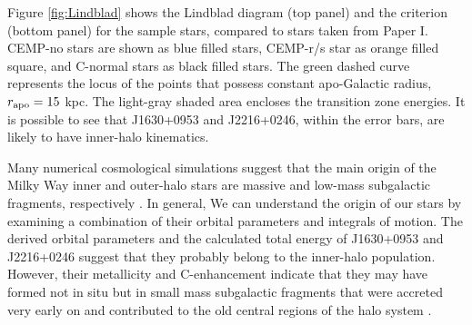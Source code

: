 Figure \ref{fig:Lindblad} shows the Lindblad diagram (top panel) and the
\citet{2014ApJ...788..180C} criterion (bottom panel) for the sample stars,
compared to stars taken from Paper I. CEMP-no stars are shown as blue filled
stars, CEMP-r/s star as orange filled square, and C-normal stars as black filled
stars. The green dashed curve represents the locus of the points that possess
constant apo-Galactic radius, $r_\mathrm{apo} = 15$ kpc. The light-gray shaded area
encloses the transition zone energies. It is possible to see that J1630+0953
and J2216+0246, within the error bars, are likely to have inner-halo kinematics. 

Many numerical cosmological simulations suggest that the main origin of the
Milky Way inner and outer-halo stars are massive and low-mass subgalactic fragments,
respectively \citep{2009ApJ...702.1058Z,2011MNRAS.416.2802F,2012MNRAS.420.2245M,
2012AAS...21922206B,  2013MNRAS.432.3391T, 2014MNRAS.439.3128T}. In general, We
can understand the origin of our stars by examining a combination of their
orbital parameters and integrals of motion. The derived orbital parameters and
the calculated total energy of J1630+0953 and J2216+0246 suggest that they
probably belong to the inner-halo population. However, their metallicity
and C-enhancement indicate that they may have formed not in situ but in small
mass subgalactic fragments that were accreted very early on and contributed to
the old central regions of the halo system
\citep[e.g.,][]{2018MNRAS.473.1656T}.
